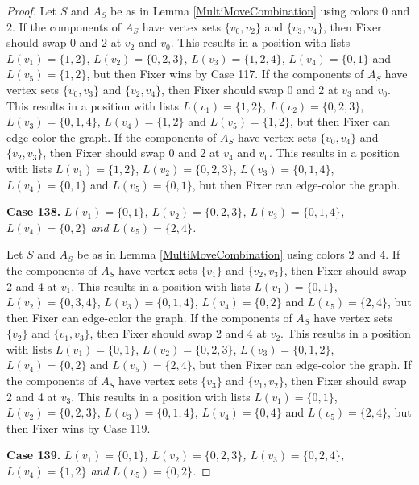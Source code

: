\documentclass[12pt]{amsart}
\theoremstyle{plain}
\theoremstyle{definition}
\theoremstyle{remark}
\begin{document}
\begin{proof}
Let $S$ and $A_S$ be as in Lemma \ref{MultiMoveCombination} using colors $0$ and $2$. If the components of $A_S$ have vertex sets $\{v_0, v_2\}$ and $\{v_3, v_4\}$, then Fixer should swap 0 and 2 at $v_2$ and $v_0$. This results in a position with lists $L(v_1) = \{1, 2\}$, $L(v_2) = \{0, 2, 3\}$, $L(v_3) = \{1, 2, 4\}$, $L(v_4) = \{0, 1\}$ and $L(v_5) = \{1, 2\}$, but then Fixer wins by Case 117.
If the components of $A_S$ have vertex sets $\{v_0, v_3\}$ and $\{v_2, v_4\}$, then Fixer should swap 0 and 2 at $v_3$ and $v_0$. This results in a position with lists $L(v_1) = \{1, 2\}$, $L(v_2) = \{0, 2, 3\}$, $L(v_3) = \{0, 1, 4\}$, $L(v_4) = \{1, 2\}$ and $L(v_5) = \{1, 2\}$, but then Fixer can edge-color the graph.
If the components of $A_S$ have vertex sets $\{v_0, v_4\}$ and $\{v_2, v_3\}$, then Fixer should swap 0 and 2 at $v_4$ and $v_0$. This results in a position with lists $L(v_1) = \{1, 2\}$, $L(v_2) = \{0, 2, 3\}$, $L(v_3) = \{0, 1, 4\}$, $L(v_4) = \{0, 1\}$ and $L(v_5) = \{0, 1\}$, but then Fixer can edge-color the graph.

\noindent\textbf{Case 138.  }\textit{$L(v_1) = \{0, 1\}$, $L(v_2) = \{0, 2, 3\}$, $L(v_3) = \{0, 1, 4\}$, $L(v_4) = \{0, 2\}$ and $L(v_5) = \{2, 4\}$.}

Let $S$ and $A_S$ be as in Lemma \ref{MultiMoveCombination} using colors $2$ and $4$. If the components of $A_S$ have vertex sets $\{v_1\}$ and $\{v_2, v_3\}$, then Fixer should swap 2 and 4 at $v_1$. This results in a position with lists $L(v_1) = \{0, 1\}$, $L(v_2) = \{0, 3, 4\}$, $L(v_3) = \{0, 1, 4\}$, $L(v_4) = \{0, 2\}$ and $L(v_5) = \{2, 4\}$, but then Fixer can edge-color the graph.
If the components of $A_S$ have vertex sets $\{v_2\}$ and $\{v_1, v_3\}$, then Fixer should swap 2 and 4 at $v_2$. This results in a position with lists $L(v_1) = \{0, 1\}$, $L(v_2) = \{0, 2, 3\}$, $L(v_3) = \{0, 1, 2\}$, $L(v_4) = \{0, 2\}$ and $L(v_5) = \{2, 4\}$, but then Fixer can edge-color the graph.
If the components of $A_S$ have vertex sets $\{v_3\}$ and $\{v_1, v_2\}$, then Fixer should swap 2 and 4 at $v_3$. This results in a position with lists $L(v_1) = \{0, 1\}$, $L(v_2) = \{0, 2, 3\}$, $L(v_3) = \{0, 1, 4\}$, $L(v_4) = \{0, 4\}$ and $L(v_5) = \{2, 4\}$, but then Fixer wins by Case 119.

\noindent\textbf{Case 139.  }\textit{$L(v_1) = \{0, 1\}$, $L(v_2) = \{0, 2, 3\}$, $L(v_3) = \{0, 2, 4\}$, $L(v_4) = \{1, 2\}$ and $L(v_5) = \{0, 2\}$.}


\end{proof}
\end{document}
